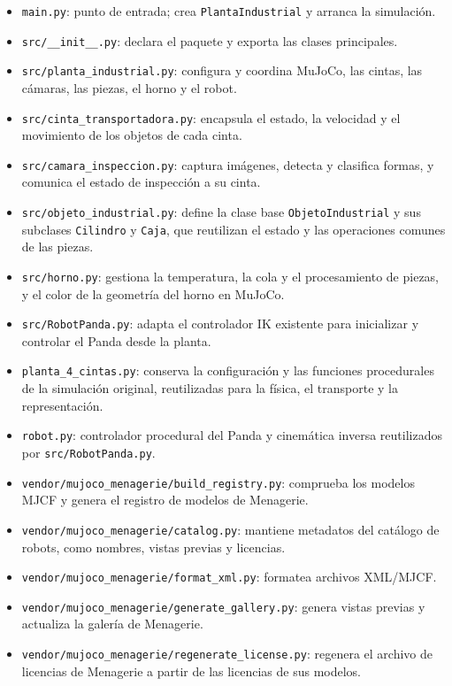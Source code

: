 \documentclass[12pt,a4paper]{article}
\begin{document}
\begin{itemize}
    \item \texttt{main.py}: punto de entrada; crea \texttt{PlantaIndustrial} y arranca la simulación.
    \item \texttt{src/\_\_init\_\_.py}: declara el paquete y exporta las clases principales.
    \item \texttt{src/planta\_industrial.py}: configura y coordina MuJoCo, las cintas, las cámaras, las piezas, el horno y el robot.
    \item \texttt{src/cinta\_transportadora.py}: encapsula el estado, la velocidad y el movimiento de los objetos de cada cinta.
    \item \texttt{src/camara\_inspeccion.py}: captura imágenes, detecta y clasifica formas, y comunica el estado de inspección a su cinta.
    \item \texttt{src/objeto\_industrial.py}: define la clase base \texttt{ObjetoIndustrial} y sus subclases \texttt{Cilindro} y \texttt{Caja}, que reutilizan el estado y las operaciones comunes de las piezas.
    \item \texttt{src/horno.py}: gestiona la temperatura, la cola y el procesamiento de piezas, y el color de la geometría del horno en MuJoCo.
    \item \texttt{src/RobotPanda.py}: adapta el controlador IK existente para inicializar y controlar el Panda desde la planta.
    \item \texttt{planta\_4\_cintas.py}: conserva la configuración y las funciones procedurales de la simulación original, reutilizadas para la física, el transporte y la representación.
    \item \texttt{robot.py}: controlador procedural del Panda y cinemática inversa reutilizados por \texttt{src/RobotPanda.py}.
    \item \texttt{vendor/mujoco\_menagerie/build\_registry.py}: comprueba los modelos MJCF y genera el registro de modelos de Menagerie.
    \item \texttt{vendor/mujoco\_menagerie/catalog.py}: mantiene metadatos del catálogo de robots, como nombres, vistas previas y licencias.
    \item \texttt{vendor/mujoco\_menagerie/format\_xml.py}: formatea archivos XML/MJCF.
    \item \texttt{vendor/mujoco\_menagerie/generate\_gallery.py}: genera vistas previas y actualiza la galería de Menagerie.
    \item \texttt{vendor/mujoco\_menagerie/regenerate\_license.py}: regenera el archivo de licencias de Menagerie a partir de las licencias de sus modelos.

\end{itemize}
\end{document}

